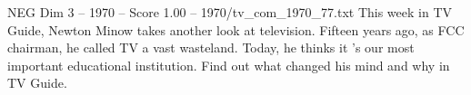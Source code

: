 \begin{textsample}{NEG Dim 3 – 1970 – Score 1.00 – 1970/tv\_com\_1970\_77.txt}  \label{ex:f3_neg_067}
This week in TV Guide, Newton Minow takes another look at television.
Fifteen years ago, as FCC chairman, he called TV a vast wasteland.
Today, he thinks it 's our most important educational institution.
Find out what changed his mind and why in TV Guide.

\end{textsample}
